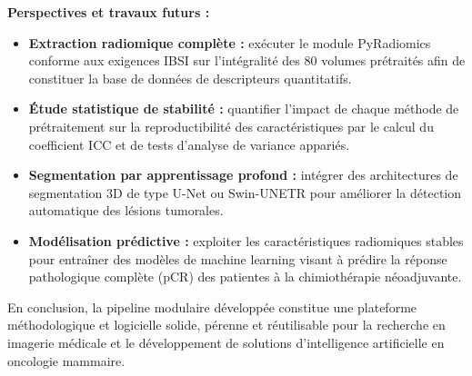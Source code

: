 \documentclass[12pt,a4paper]{report}
\begin{document}
    \textbf{Perspectives et travaux futurs :}
    \begin{itemize}
        \item \textbf{Extraction radiomique complète :} exécuter le module PyRadiomics conforme aux exigences IBSI sur l'intégralité des 80 volumes prétraités afin de constituer la base de données de descripteurs quantitatifs.
        \item \textbf{Étude statistique de stabilité :} quantifier l'impact de chaque méthode de prétraitement sur la reproductibilité des caractéristiques par le calcul du coefficient ICC et de tests d'analyse de variance appariés.
        \item \textbf{Segmentation par apprentissage profond :} intégrer des architectures de segmentation 3D de type U-Net ou Swin-UNETR pour améliorer la détection automatique des lésions tumorales.
        \item \textbf{Modélisation prédictive :} exploiter les caractéristiques radiomiques stables pour entraîner des modèles de machine learning visant à prédire la réponse pathologique complète (pCR) des patientes à la chimiothérapie néoadjuvante.
    \end{itemize}

    En conclusion, la pipeline modulaire développée constitue une plateforme méthodologique et logicielle solide, pérenne et réutilisable pour la recherche en imagerie médicale et le développement de solutions d'intelligence artificielle en oncologie mammaire.
\end{document}
